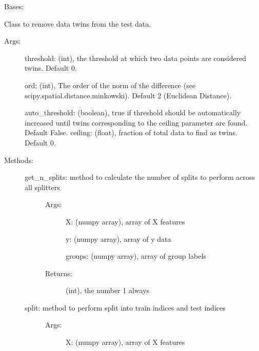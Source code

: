 \documentclass[letterpaper,10pt,english]{sphinxmanual}
\begin{document}
\begin{fulllineitems}
\label{\detokenize{api/mastml.data_splitters.LeaveOutTwinCV:mastml.data_splitters.LeaveOutTwinCV}}
Bases: {\hyperref[\detokenize{api/mastml.data_splitters.BaseSplitter:mastml.data_splitters.BaseSplitter}]{}}

Class to remove data twins from the test data.
\begin{description}
\item[{Args:}] \leavevmode
threshold: (int), the threshold at which two data points are considered twins. Default 0.

ord: (int), The order of the norm of the difference (see scipy.spatial.distance.minkowski). Default 2 (Euclidean Distance).

auto\_threshold: (boolean), true if threshold should be automatically increased until twins corresponding to the ceiling parameter are found. Default False.
ceiling: (float), fraction of total data to find as twins. Default 0.

\item[{Methods:}] \leavevmode\begin{description}
\item[{get\_n\_splits: method to calculate the number of splits to perform across all splitters}] \leavevmode\begin{description}
\item[{Args:}] \leavevmode
X: (numpy array), array of X features

y: (numpy array), array of y data

groups: (numpy array), array of group labels

\item[{Returns:}] \leavevmode
(int), the number 1 always

\end{description}

\item[{split: method to perform split into train indices and test indices}] \leavevmode\begin{description}
\item[{Args:}] \leavevmode
X: (numpy array), array of X features


\end{description}
\end{description}
\end{description}
\end{fulllineitems}
\end{document}
